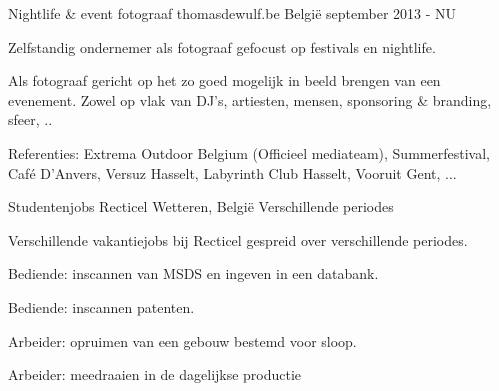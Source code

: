 


\begin{cventries}


\cventry
{Nightlife \& event fotograaf} %
{thomasdewulf.be} %
{België} %
{september 2013 - NU} %
{ %
\begin{cvitems}
\item {Zelfstandig ondernemer als fotograaf gefocust op festivals en nightlife. }
\item {Als fotograaf gericht op het zo goed mogelijk in beeld brengen van een evenement. Zowel op vlak van DJ's, artiesten, mensen, sponsoring \& branding, sfeer, ..}
\item {Referenties: Extrema Outdoor Belgium (Officieel mediateam), Summerfestival, Café D'Anvers, Versuz Hasselt, Labyrinth Club Hasselt, Vooruit Gent, ...}
\end{cvitems}
}


\cventry
{Studentenjobs} %
{Recticel} %
{Wetteren, België} %
{Verschillende periodes } %
{ %
\begin{cvitems}
\item {Verschillende vakantiejobs bij Recticel gespreid over verschillende periodes.}
\item {Bediende: inscannen van MSDS en ingeven in een databank.}
\item {Bediende: inscannen patenten.}
\item {Arbeider: opruimen van een gebouw bestemd voor sloop.}
\item {Arbeider: meedraaien in de dagelijkse productie}
\end{cvitems}
}



\end{cventries}